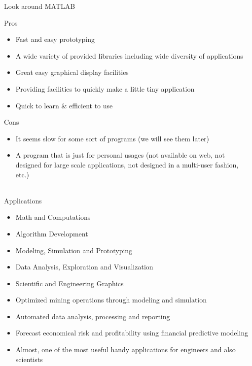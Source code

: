 \documentclass{beamer}
\begin{document}
\begin{frame}{Look around MATLAB}
	\begin{block}{Pros}
		\begin{itemize}
			\item Fast and easy prototyping
			\item A wide variety of provided libraries including wide diversity of applications
			\item Great easy graphical display facilities
			\item Providing facilities to quickly make a little tiny application
			\item Quick to learn \& efficient to use
		\end{itemize}
	\end{block}
	\begin{alertblock}{Cons}
		\begin{itemize}
			\item It seems slow for some sort of programs (we will see them later)
			\item A program that is just for personal usages (not available on web, not designed for large scale applications, not designed in a multi-user fashion, etc.)

		\end{itemize}
	\end{alertblock}
\end{frame}


\begin{frame}{\\Applications}
	\begin{block}{}
		\begin{itemize}
			\item Math and Computations
			\item Algorithm Development
			\item Modeling, Simulation and Prototyping
			\item Data Analysis, Exploration and Visualization
			\item Scientific and Engineering Graphics
			\item Optimized mining operations through modeling and simulation
			\item Automated data analysis, processing and reporting
			\item Forecast economical risk and profitability using financial predictive modeling
			\item Almost, one of the most useful handy applications for engineers and also scientists
		\end{itemize}
	\end{block}
\end{frame}
\end{document}
